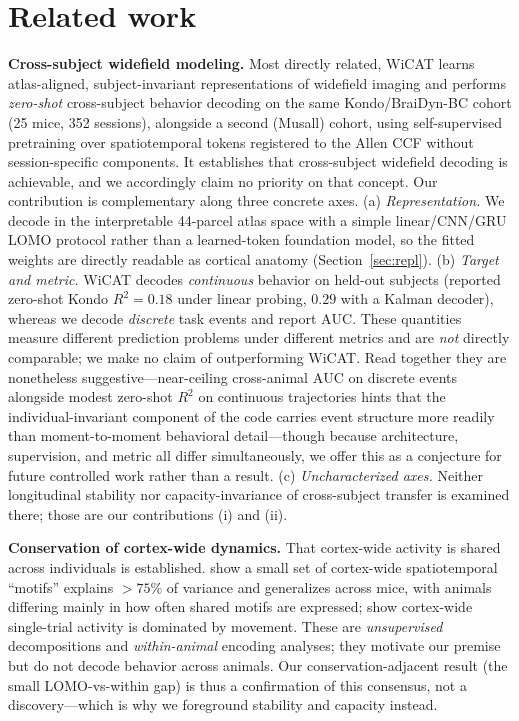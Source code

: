 \documentclass{article}
\newcommand{\auc}{\mathrm{AUC}}
\begin{document}
\section{Related work}
\label{sec:related}
\textbf{Cross-subject widefield modeling.} Most directly related, WiCAT \citep{wicat2026}
learns atlas-aligned, subject-invariant representations of widefield imaging and performs
\emph{zero-shot} cross-subject behavior decoding on the same Kondo/BraiDyn-BC cohort (25 mice,
352 sessions), alongside a second (Musall) cohort, using self-supervised pretraining over
spatiotemporal tokens registered to the Allen CCF without session-specific components. It
establishes that cross-subject widefield decoding is achievable, and we accordingly claim no
priority on that concept. Our contribution is complementary along three concrete axes.
(a) \emph{Representation.} We decode in the interpretable 44-parcel atlas space with a simple
linear/CNN/GRU LOMO protocol rather than a learned-token foundation model, so the fitted weights
are directly readable as cortical anatomy (Section~\ref{sec:repl}).
(b) \emph{Target and metric.} WiCAT decodes \emph{continuous} behavior on held-out subjects
(reported zero-shot Kondo $R^2=0.18$ under linear probing, $0.29$ with a Kalman decoder), whereas
we decode \emph{discrete} task events and report $\auc$. These quantities measure different
prediction problems under different metrics and are \emph{not} directly comparable; we make no
claim of outperforming WiCAT. Read together they are nonetheless suggestive---near-ceiling
cross-animal $\auc$ on discrete events alongside modest zero-shot $R^2$ on continuous
trajectories hints that the individual-invariant component of the code carries event structure
more readily than moment-to-moment behavioral detail---though because architecture, supervision,
and metric all differ simultaneously, we offer this as a conjecture for future controlled work
rather than a result.
(c) \emph{Uncharacterized axes.} Neither longitudinal stability nor capacity-invariance of
cross-subject transfer is examined there; those are our contributions (i) and (ii).

\textbf{Conservation of cortex-wide dynamics.} That cortex-wide activity is shared across
individuals is established. \citet{macdowell2020,macdowell2024} show a small set of cortex-wide
spatiotemporal ``motifs'' explains $>75\%$ of variance and generalizes across mice, with animals
differing mainly in how often shared motifs are expressed; \citet{musall2019} show cortex-wide
single-trial activity is dominated by movement. These are \emph{unsupervised} decompositions and
\emph{within-animal} encoding analyses; they motivate our premise but do not decode behavior
across animals. Our conservation-adjacent result (the small LOMO-vs-within gap) is thus a
confirmation of this consensus, not a discovery---which is why we foreground stability and
capacity instead.
\end{document}
